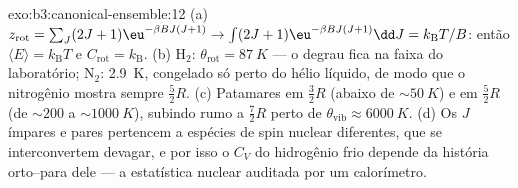 \begin{solution}{exo:b3:canonical-ensemble:12}
(a) $z_{\text{rot}} = \sum_J(2J+1)\eu^{-\beta BJ(J+1)}
\to \int(2J+1)\eu^{-\beta BJ(J+1)}\dd J = k_{\text{B}}T/B$: então
$\langle E\rangle = k_{\text{B}}T$ e $C_{\text{rot}} =
k_{\text{B}}$. (b) H$_2$: $\theta_{\text{rot}} = \qty{87}{K}$ --- o
degrau fica na faixa do laboratório; N$_2$: \qty{2.9}{K}, congelado só
perto do hélio líquido, de modo que o nitrogênio mostra sempre
$\tfrac52 R$. (c) Patamares em $\tfrac32 R$ (abaixo de
$\sim\qty{50}{K}$) e em $\tfrac52 R$ (de $\sim200$ a
$\sim\qty{1000}{K}$), subindo rumo a $\tfrac72 R$ perto de $\theta_{\text{vib}} \approx
\qty{6000}{K}$. (d) Os $J$ ímpares e pares
pertencem a espécies de spin nuclear diferentes, que se interconvertem
devagar, e por isso o $C_V$ do hidrogênio frio depende da história
orto--para dele --- a estatística nuclear auditada por um calorímetro.
\end{solution}

